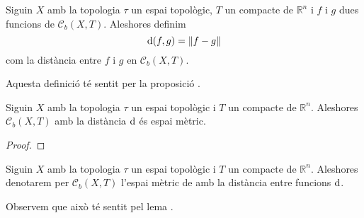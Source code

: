 \documentclass[../../Main.tex]{subfiles}
\begin{document}
	\begin{definition}
		\label{def:distància entre funcions acotades}
		Siguin \(X\) amb la topologia \(\tau\) un espai topològic, \(T\) un compacte de \(\mathbb{R}^{n}\) i \(f\) i \(g\) dues funcions de \(\mathcal{C}_{b}(X,T)\).
		Aleshores definim
		\[
		    \distancia(f,g)=\norm{f-g}
		\]
		com la distància entre \(f\) i \(g\) en \(\mathcal{C}_{b}(X,T)\).
		
		Aquesta definició té sentit per la proposició .
	\end{definition}
	\begin{lemma}
		\label{thm:l'espai de funcions contínues i acotades és un espai mètric}
		Siguin \(X\) amb la topologia \(\tau\) un espai topològic i \(T\) un compacte de \(\mathbb{R}^{n}\).
		Aleshores \(\mathcal{C}_{b}(X,T)\) amb la distància \(\operatorname{d}\) és espai mètric.
		\begin{proof}
		\end{proof}
	\end{lemma}
	\begin{notation}
		Siguin \(X\) amb la topologia \(\tau\) un espai topològic i \(T\) un compacte de \(\mathbb{R}^{n}\).
		Aleshores denotarem per \(\mathcal{C}_{b}(X,T)\) l'espai mètric de amb la distància entre funcions \(\operatorname{d}\).
		
		Observem que això té sentit pel lema .
	\end{notation}
\end{document}
